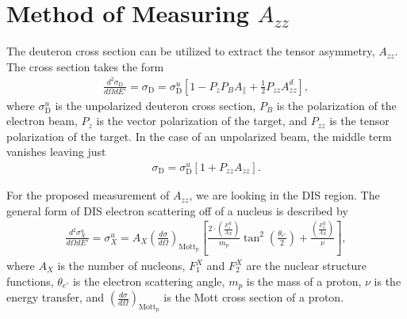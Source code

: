 \documentclass[11pt]{article}
\begin{document}




%
\pagestyle{plain}

\section{Method of Measuring $A_{zz}$}

The deuteron cross section can be utilized to extract the tensor asymmetry, $A_{zz}$. The cross section takes the form
\begin{eqnarray}
 \frac{d^2\sigma_{\mathrm{D}}}{d\Omega dE'} = \sigma_{\mathrm{D}} = \sigma_{\mathrm{D}}^u\left[ 1  - P_z P_B A_{\parallel} + \frac{1}{2}P_{zz}A_{zz}^d \right],
\label{xs} 
\end{eqnarray}
where $\sigma_{\mathrm{D}}^u$ is the unpolarized deuteron cross section, $P_B$ is the polarization of the electron beam, $P_z$ is the vector polarization of the target, and $P_{zz}$ is the tensor polarization of the target. In the case of an unpolarized beam, the middle term vanishes leaving just
\begin{eqnarray}
\sigma_{\mathrm{D}} = \sigma_{\mathrm{D}}^u \left[1 + P_{zz} A_{zz}\right].
\label{xsbis} 
\end{eqnarray}

For the proposed measurement of $A_{zz}$, we are looking in the DIS region. The general form of DIS electron scattering off of a nucleus is described by
\begin{eqnarray}
\frac{d^2\sigma^u_X}{d\Omega dE'} = \sigma^u_X = A_X \left( \frac{d\sigma}{d\Omega} \right) _{\mathrm{Mott}_{\mathrm{p}}} \left[ \frac{2\cdot \left(\frac{F_1^{X}}{A_X} \right)}{m_{p}}\tan^2\left( \frac{\theta_{e'}}{2} \right) + \frac{\left( \frac{F_2^X}{A_X}\right) }{\nu} \right],
\end{eqnarray}
where $A_X$ is the number of nucleons, $F_1^X$ and $F_2^X$ are the nuclear structure functions, $\theta_{e'}$ is the electron scattering angle, $m_p$ is the mass of a proton, $\nu$ is the energy transfer, and $\left( \frac{d\sigma}{d\Omega} \right) _{\mathrm{Mott}_{\mathrm{p}}}$ is the Mott cross section of a proton.
\end{document}
